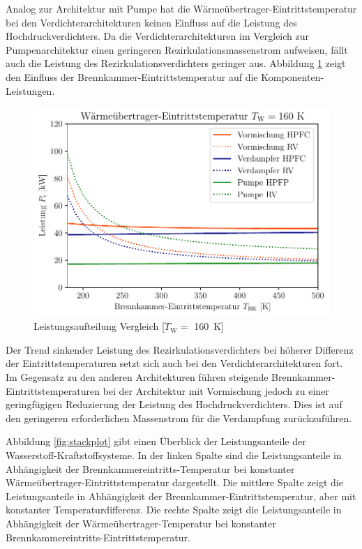Analog zur Architektur mit Pumpe hat die Wärmeübertrager-Eintrittstemperatur bei den Verdichterarchitekturen keinen Einfluss auf die Leistung des Hochdruckverdichters. Da die Verdichterarchitekturen im Vergleich zur Pumpenarchitektur einen geringeren Rezirkulationsmassenstrom aufweisen, fällt auch die Leistung des Rezirkulationsverdichters geringer aus. Abbildung \ref{fig:tbk_split} zeigt den Einfluss der Brennkammer-Eintrittstemperatur auf die Komponenten-Leistungen.

\begin{figure}[ht]
\centering
\includegraphics[width=0.7\linewidth]{4_Abbildungen/2_Hauptteil/Ergebnisse/tbkcomp.pdf}
  \caption{Leistungsaufteilung Vergleich [$T_\mathrm{W}=$ \SI{160}{\K}]}
  \label{fig:tbk_split}
\end{figure}
\FloatBarrier

Der Trend sinkender Leistung des Rezirkulationsverdichters bei höherer Differenz der Eintrittstemperaturen setzt sich auch bei den Verdichterarchitekturen fort. Im Gegensatz zu den anderen Architekturen führen steigende Brennkammer-Eintrittstemperaturen bei der Architektur mit Vormischung jedoch zu einer geringfügigen Reduzierung der Leistung des Hochdruckverdichters. Dies ist auf den geringeren erforderlichen Massenstrom für die Verdampfung zurückzuführen. 

Abbildung \ref{fig:stackplot} gibt einen Überblick der Leistungsanteile der Wasserstoff-Kraftstoffsysteme. In der linken Spalte sind die Leistungsanteile in Abhängigkeit der Brennkammereintritts-Temperatur bei konstanter Wärmeübertrager-Eintrittstemperatur dargestellt. Die mittlere Spalte zeigt die Leistungsanteile in Abhängigkeit der Brennkammer-Eintrittstemperatur, aber mit konstanter Temperaturdifferenz. Die rechte Spalte zeigt die Leistungsanteile in Abhängigkeit der Wärmeübertrager-Temperatur bei konstanter Brennkammereintritts-Eintrittstemperatur.

